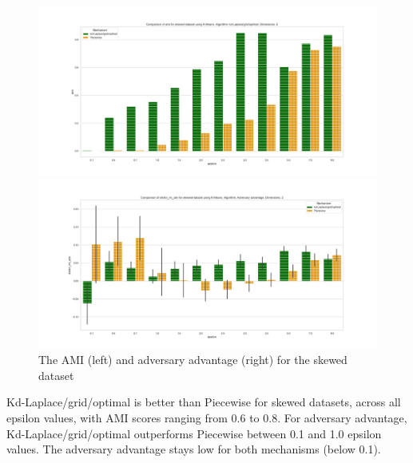 \begin{figure}[H]
    \begin{minipage}[c]{0.55\textwidth}
        \includegraphics[width=\textwidth]{Results/RQ3/skewed-dataset/ami_skewed-dataset_comparison.png}
    \end{minipage}
    \begin{minipage}[c]{0.55\textwidth}
        \includegraphics[width=\textwidth]{Results/RQ3/skewed-dataset/shokri_mi_adv_skewed-dataset_comparison.png}
    \end{minipage}
    \label{fig:advantage_skewed-dataset_comparison}
    \caption{The AMI (left) and adversary advantage (right) for the skewed dataset}

\end{figure}
Kd-Laplace/grid/optimal is better than Piecewise for skewed datasets, across all epsilon values, with AMI scores ranging from 0.6 to 0.8. For adversary advantage, Kd-Laplace/grid/optimal outperforms Piecewise between 0.1 and 1.0 epsilon values. The adversary advantage stays low for both mechanisms (below 0.1).



